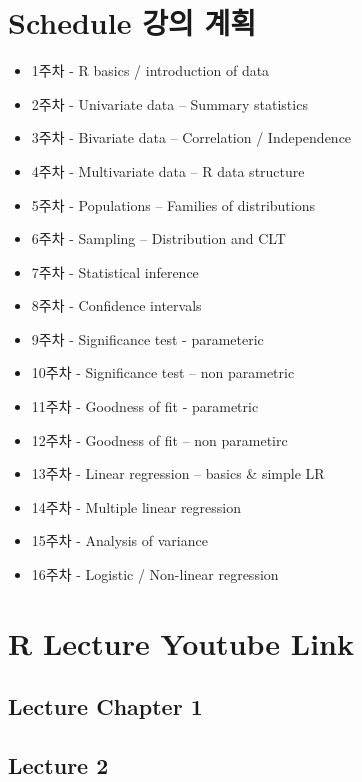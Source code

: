 \documentclass[
]{book}
\providecommand{\tightlist}{%
  \setlength{\itemsep}{0pt}\setlength{\parskip}{0pt}}
\begin{document}
\hypertarget{schedule-uxac15uxc758-uxacc4uxd68d}{%
\section{Schedule 강의 계획}\label{schedule-uxac15uxc758-uxacc4uxd68d}}

\begin{itemize}
\tightlist
\item
  1주차 - R basics / introduction of data
\item
  2주차 - Univariate data -- Summary statistics
\item
  3주차 - Bivariate data -- Correlation / Independence\\
\item
  4주차 - Multivariate data -- R data structure
\item
  5주차 - Populations -- Families of distributions
\item
  6주차 - Sampling -- Distribution and CLT
\item
  7주차 - Statistical inference
\item
  8주차 - Confidence intervals
\item
  9주차 - Significance test - parameteric
\item
  10주차 - Significance test -- non parametric
\item
  11주차 - Goodness of fit - parametric
\item
  12주차 - Goodness of fit -- non parametirc
\item
  13주차 - Linear regression -- basics \& simple LR
\item
  14주차 - Multiple linear regression
\item
  15주차 - Analysis of variance
\item
  16주차 - Logistic / Non-linear regression
\end{itemize}

\hypertarget{r-lecture-youtube-link}{%
\section{R Lecture Youtube Link}\label{r-lecture-youtube-link}}

\hypertarget{lecture-chapter-1}{%
\subsection{Lecture Chapter 1}\label{lecture-chapter-1}}

\hypertarget{lecture-2}{%
\subsection{Lecture 2}\label{lecture-2}}
\end{document}
